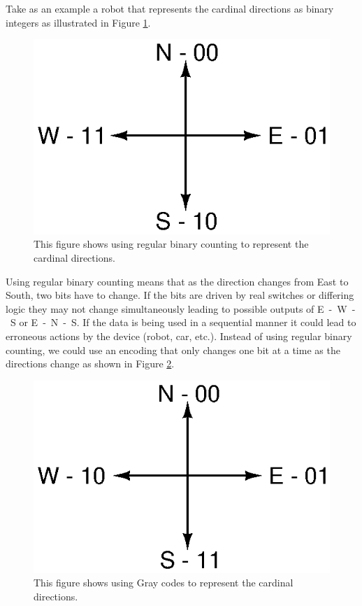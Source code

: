 Take as an example a robot that represents the cardinal directions as binary integers as illustrated in Figure \ref{fig:nongraydir}.
\begin{figure}[!htb]
	\centering
	\includegraphics[scale=0.7]{numbers/nongray.eps}
	\caption{This figure shows using regular binary counting to represent the cardinal directions.}
	\label{fig:nongraydir}
\end{figure} 

Using regular binary counting means that as the direction changes from East to South, two bits have to change. If the bits
are driven by real switches or differing logic they may not change simultaneously leading to possible outputs
of E~-~W~-~S or E~-~N~-~S. If the data is being used in a sequential manner it could lead to erroneous actions by
the device (robot, car, etc.). Instead of using regular binary counting, we could use an encoding that only changes
one bit at a time as the directions change as shown in Figure \ref{fig:graydir}.
\begin{figure}[!htb]
	\centering
	\includegraphics[scale=0.7]{numbers/gray.eps}
	\caption{This figure shows using Gray codes to represent the cardinal directions.}
	\label{fig:graydir}
\end{figure} 

